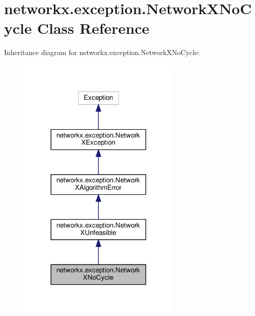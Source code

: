 \hypertarget{classnetworkx_1_1exception_1_1NetworkXNoCycle}{}\section{networkx.\+exception.\+Network\+X\+No\+Cycle Class Reference}
\label{classnetworkx_1_1exception_1_1NetworkXNoCycle}


Inheritance diagram for networkx.\+exception.\+Network\+X\+No\+Cycle\+:
\nopagebreak
\begin{figure}[H]
\begin{center}
\leavevmode
\includegraphics[width=221pt]{classnetworkx_1_1exception_1_1NetworkXNoCycle__inherit__graph}
\end{center}
\end{figure}



